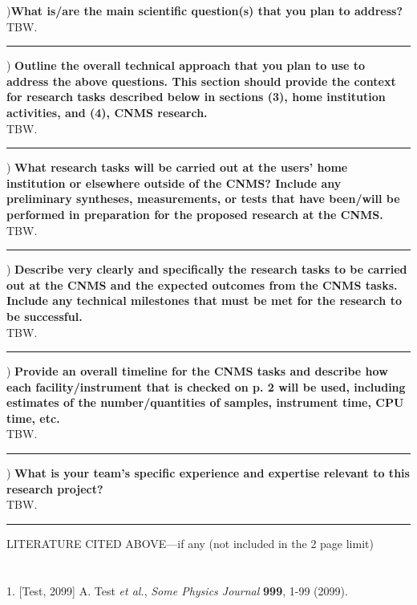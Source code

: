 \documentclass[letterpaper]{article}
\begin{document}
\begin{small}
){\bf What is/are the main scientific question(s) that you plan to address?}\\

TBW.  \\
\rule{\textwidth}{1pt}

) {\bf Outline the overall technical approach that you plan to use to address the above questions.
This section should provide the context for research tasks described below in sections (3), home institution activities, and (4), CNMS research. }\\

TBW. \\
\rule{\textwidth}{1pt}

) {\bf What research tasks will be carried out at the users' home institution or elsewhere outside of the CNMS?
Include any preliminary syntheses, measurements, or tests that have been/will be performed in preparation for the proposed research at the CNMS. }\\

TBW.


\rule{\textwidth}{1pt}

) {\bf Describe very clearly and specifically the research tasks to be carried out at the CNMS and the expected outcomes from the CNMS tasks.
Include any technical milestones that must be met for the research to be successful.} \\

TBW. \\
\rule{\textwidth}{1pt}

) {\bf Provide an overall timeline for the CNMS tasks and describe how each facility/instrument that is checked on p. 2 will be used,
including estimates of the number/quantities of samples, instrument time, CPU time, etc.} \\

TBW. \\
\rule{\textwidth}{1pt}

) {\bf What is your team's specific experience and expertise relevant to this research project? }\\

TBW.\\
\rule{\textwidth}{1pt}

\noindent LITERATURE CITED ABOVE---if any (not included in the 2 page limit)\\
\\ \\
1. [Test, 2099] A. Test {\it et al.}, {\it Some Physics Journal} {\bf 999}, 1-99 (2099).\\


\end{small}
\end{document}
